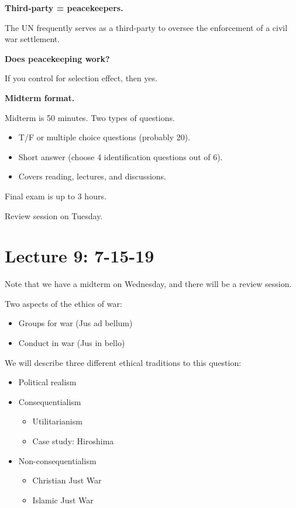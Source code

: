 \documentclass{article}
\begin{document}
{\bf Third-party = peacekeepers.}

The UN frequently serves as a third-party to oversee the enforcement of a civil war settlement.

{\bf Does peacekeeping work?}

If you control for selection effect, then yes.

{\bf Midterm format.}

Midterm is 50 minutes. Two types of questions.
\begin{itemize}
  \item T/F or multiple choice questions (probably 20).
  \item Short answer (choose 4 identification questions out of 6).
  \item Covers reading, lectures, and discussions.
\end{itemize}

Final exam is up to 3 hours.

Review session on Tuesday.

\section{Lecture 9: 7-15-19}

Note that we have a midterm on Wednesday, and there will be a review session.

Two aspects of the ethics of war:

\begin{itemize}
  \item Groups for war (Jus ad bellum)
  \item Conduct in war (Jus in bello)
\end{itemize}

We will describe three different ethical traditions to this question:

\begin{itemize}
  \item Political realism
  \item Consequentialism
    \begin{itemize}
      \item Utilitarianism
      \item Case study: Hiroshima
    \end{itemize}
  \item Non-consequentialism
    \begin{itemize}
      \item Christian Just War
      \item Islamic Just War
    \end{itemize}
\end{itemize}
\end{document}
